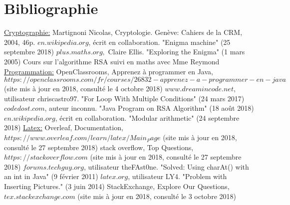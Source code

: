 \documentclass[a4paper,12pt]{report}
\begin{document}
     \section{Bibliographie}
     \underline{Cryptographie:} \newline
     [1] Martignoni Nicolas, Cryptologie. Genève: Cahiers de la CRM, 2004, 46p. \newline
     [2] $en.wikipedia.org$, écrit en collaboration. "Enigma machine" (25 septembre 2018) \newline
     [3] $plus.maths.org,$ Claire Ellis. "Exploring the Enigma" (1 mars 2005) \newline
     [4] Cours sur l'algorithme RSA suivi en maths avec Mme Reymond \newline
     \newline
     \underline{Programmation:} \newline
     [5] OpenClassrooms, Apprenez à programmer en Java, \newline $https://openclassrooms.com/fr/courses/26832-apprenez-a-programmer-en-java $(site mis à jour en 2018, consulté le 4 octobre 2018) \newline
     [6] $www.dreamincode.net$, utilisateur chriscastro97. "For Loop With Multiple Conditions" (24 mars 2017) \newline
     [7] $codedost.com$, auteur inconnu. "Java Program on RSA Algorithm" (18 août 2018) \newline
     [8] $en.wikipedia.org$, écrit en collaboration. "Modular arithmetic" (24 septembre 2018) \newline
     \newline
     \underline{Latex:} \newline
     [9] Overleaf, Documentation, \newline $https://www.overleaf.com/learn/latex/Main_Page$ (site mis à jour en 2018, consulté le 27 septembre 2018) \newline
     [10] stack overflow, Top Questions, $https://stackoverflow.com$ (site mis à jour en 2018, consulté le 27 septembre 2018) \newline
     [11] $forums.techguy.org$, utilisateur theFAst0ne. "Solved: Using charAt() with an int in Java" (9 février 2011) \newline
     [12] $latex.org$, utilisateur LY4. "Problem with Inserting Pictures." (3 juin 2014) \newline
     [13] StackExchange, Explore Our Questions, $tex.stackexchange.com$ (site mis à jour en 2018, consulté le 3 octobre 2018)  
     
\pagebreak     
     
     
\end{document}
